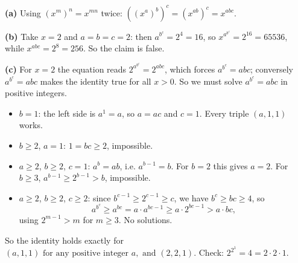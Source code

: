 \textbf{(a)} Using $(x^m)^n=x^{mn}$ twice: $\left(\left(x^a\right)^b\right)^c=\left(x^{ab}\right)^c=x^{abc}$.

\textbf{(b)} Take $x=2$ and $a=b=c=2$: then $a^{b^c}=2^{4}=16$, so $x^{a^{b^c}}=2^{16}=65536$, while $x^{abc}=2^8=256$. So the claim is false.

\textbf{(c)} For $x=2$ the equation reads $2^{a^{b^c}}=2^{abc}$, which forces $a^{b^c}=abc$; conversely $a^{b^c}=abc$ makes the identity true for all $x>0$. So we must solve $a^{b^c}=abc$ in positive integers.
\begin{itemize}
\item $b=1$: the left side is $a^1=a$, so $a=ac$ and $c=1$. Every triple $(a,1,1)$ works.
\item $b\ge2$, $a=1$: $1=bc\ge2$, impossible.
\item $a\ge2$, $b\ge2$, $c=1$: $a^b=ab$, i.e. $a^{b-1}=b$. For $b=2$ this gives $a=2$. For $b\ge3$, $a^{b-1}\ge2^{b-1}>b$, impossible.
\item $a\ge2$, $b\ge2$, $c\ge2$: since $b^{c-1}\ge2^{c-1}\ge c$, we have $b^c\ge bc\ge4$, so
\[
a^{b^c}\ge a^{bc}=a\cdot a^{bc-1}\ge a\cdot2^{bc-1}>a\cdot bc ,
\]
using $2^{m-1}>m$ for $m\ge3$. No solutions.
\end{itemize}
So the identity holds exactly for $\boxed{(a,1,1)\text{ for any positive integer }a,\text{ and }(2,2,1)}$. Check: $2^{2^1}=4=2\cdot2\cdot1$.

